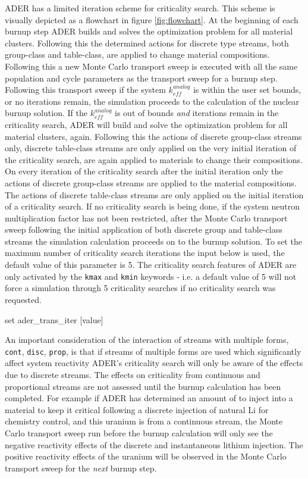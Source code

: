 ADER has a limited iteration scheme for criticality search. This scheme is
visually depicted as a flowchart in figure \ref{fig:flowchart}.
At the beginning of
each burnup step ADER builds and solves the optimization problem for all
material clusters. Following this the determined actions for discrete type
streams, both group-class and table-class, are applied to change material
compositions. Following this a new Monte Carlo transport sweep is
executed with all the same population and cycle parameters as the transport sweep
for a burnup step. Following this transport sweep if the system
$k_{eff}^{analog}$ is within the user set bounds, or no iterations remain,
 the simulation proceeds to
the calculation of the nuclear burnup solution. If the $k_{eff}^{analog}$ is
out of bounds \textit{and} iterations remain in the criticality search, ADER
will build and solve the optimization problem for all material clusters, again.
Following this the actions of discrete group-class streams only, discrete
table-class streams are only applied on the very initial iteration of the
criticality search, are again applied to materials to change their compositions.
On every iteration of the criticality search after the initial iteration only
the actions of discrete group-class streams are applied to the material
compositions. The actions of discrete table-class streams are only applied
on the initial iteration of a criticality search. If no criticality search
is being done, if the system neutron multiplication factor has not been
restricted, after the Monte Carlo transport sweep following the initial
application of both discrete group and table-class streams the simulation
calculation proceeds on to the burnup solution. To set the maximum number
of criticality search iterations the input below is used, the default value
of this parameter is 5. The criticality search features of ADER
are only activated by the \texttt{kmax} and \texttt{kmin} keywords - i.e. a 
default value of 5 will not force a simulation through 5 criticality searches
if no criticality search was requested.

\begin{lt}
set ader_trans_iter [value]
\end{lt}

An important consideration of the interaction of streams with multiple
forms, \texttt{cont}, \texttt{disc}, \texttt{prop}, is that if streams of
multiple forms are used which significantly affect system reactivity ADER's
criticality search will only be aware of the effects due to discrete streams.
The effects on criticality from continuous and proportional streams are not
assessed until the burnup calculation has been completed. For
example if ADER has 
determined an amount of  to inject into a material to keep it
critical following a discrete injection of natural Li for chemistry control, and
this uranium is from a continuous stream, the Monte Carlo transport sweep run
before the burnup calculation will only see the negative reactivity effects
of the discrete and instantaneous lithium injection. The positive reactivity
effects of the uranium will be observed in the Monte Carlo transport sweep for
the \textit{next} burnup step.

